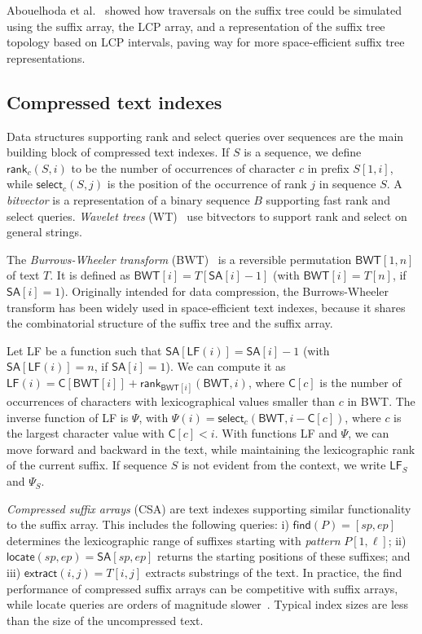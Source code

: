 \documentclass[a4paper,11pt]{llncs}
\newcommand{\SA}{\textsf{SA}}
\newcommand{\BWT}{\textsf{BWT}}
\newcommand{\CSA}{\textsf{CSA}}
\newcommand{\mSA}{\ensuremath{\mathsf{SA}}}
\newcommand{\mBWT}{\ensuremath{\mathsf{BWT}}}
\newcommand{\LCP}{\textsf{LCP}}
\newcommand{\WT}{\textsf{WT}}
\newcommand{\mC}{\ensuremath{\mathsf{C}}}
\newcommand{\LF}{\textsf{LF}}
\newcommand{\find}{\textsf{find}}
\newcommand{\locate}{\textsf{locate}}
\newcommand{\rank}{\textsf{rank}}
\newcommand{\select}{\textsf{select}}
\newcommand{\mLF}{\ensuremath{\mathsf{LF}}}
\newcommand{\mPsi}{\ensuremath{\mathsf{\Psi}}}
\newcommand{\mfind}{\ensuremath{\mathsf{find}}}
\newcommand{\mlocate}{\ensuremath{\mathsf{locate}}}
\newcommand{\mextract}{\ensuremath{\mathsf{extract}}}
\newcommand{\mrank}{\ensuremath{\mathsf{rank}}}
\newcommand{\mselect}{\ensuremath{\mathsf{select}}}
\begin{document}
Abouelhoda et al.~\cite{Abouelhoda2004} showed how traversals on the suffix
tree could be simulated using the suffix array, the \LCP{} array, and a
representation of the suffix tree topology based on \LCP{} intervals, paving
way for more space-efficient suffix tree representations.

\subsection{Compressed text indexes}

Data structures supporting \rank{} and \select{} queries over sequences are
the main building block of compressed text indexes. If $S$ is a sequence, we
define $\mrank_{c}(S,i)$ to be the number of occurrences of character $c$ in
prefix $S[1,i]$, while $\mselect_{c}(S,j)$ is the position of the occurrence
of rank $j$ in sequence $S$. A \emph{bitvector} is a representation of a
binary sequence $B$ supporting fast \rank{} and \select{} queries.
\emph{Wavelet trees} (\WT)~\cite{Grossi2003} use bitvectors to support \rank{}
and \select{} on general strings.

The \emph{Burrows-Wheeler transform} (\BWT)~\cite{Burrows1994} is a reversible
permutation $\mBWT[1,n]$ of text $T$. It is defined as $\mBWT[i] = T[\mSA[i] -
1]$ (with $\mBWT[i] = T[n]$, if $\SA[i] = 1$). Originally intended for data
compression, the Burrows-Wheeler transform has been widely used in
space-efficient text indexes, because it shares the combinatorial structure of
the suffix tree and the suffix array.

Let \LF{} be a function such that $\mSA[\mLF(i)] = \mSA[i] - 1$ (with
$\mSA[\mLF(i)] = n$, if $\mSA[i] = 1$). We can compute it as $\mLF(i) =
\mC[\mBWT[i]] + \mrank_{\mBWT[i]}(\mBWT, i)$, where $\mC[c]$ is the number of
occurrences of characters with lexicographical values smaller than $c$ in
\BWT. The inverse function of \LF{} is $\mPsi$, with $\mPsi(i) =
\mselect_{c}(\mBWT, i - \mC[c])$, where $c$ is the largest character value
with $\mC[c] < i$. With functions \LF{} and $\mPsi$, we can move forward and
backward in the text, while maintaining the lexicographic rank of the current
suffix. If sequence $S$ is not evident from the context, we write $\mLF_{S}$
and $\mPsi_{S}$.

\emph{Compressed suffix arrays} (\CSA) \cite{Ferragina2005a,Grossi2005} are
text indexes supporting similar functionality to the suffix array. This
includes the following queries: i) $\mfind(P) = [sp,ep]$ determines the
lexicographic range of suffixes starting with \emph{pattern} $P[1,\ell]$; ii)
$\mlocate(sp,ep) = \mSA[sp,ep]$ returns the starting positions of these
suffixes; and iii) $\mextract(i,j) = T[i,j]$ extracts substrings of the text.
In practice, the \find{} performance of compressed suffix arrays can be
competitive with suffix arrays, while \locate{} queries are orders of
magnitude slower~\cite{Ferragina2009a}. Typical index sizes are less than the
size of the uncompressed text.
\end{document}
